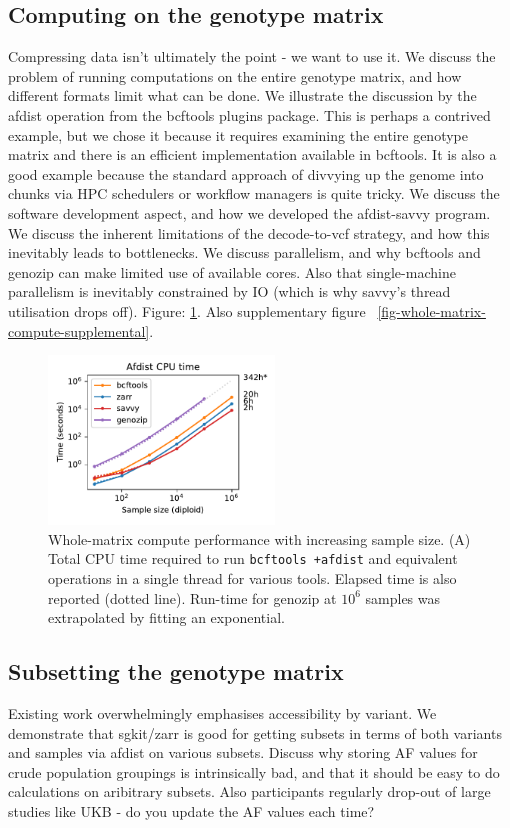 \documentclass[a4paper,num-refs]{oup-contemporary}
\begin{document}
\subsection{Computing on the genotype matrix}
Compressing data isn't ultimately the point - we want to use it.
We discuss the problem of running computations on the entire
genotype matrix, and how different formats limit what can be done.
We illustrate the discussion by the afdist operation from
the bcftools plugins package. This is perhaps a contrived example, but
we chose it because it requires examining the entire genotype matrix
and there is an efficient implementation available in bcftools.
It is also a good example because the standard approach of
divvying up the genome into chunks via HPC schedulers or workflow
managers is quite tricky.
We discuss the software development aspect, and how we developed
the afdist-savvy program. We discuss the inherent limitations
of the decode-to-vcf strategy, and how this inevitably
leads to bottlenecks. We discuss parallelism, and why
bcftools and genozip can make limited use of available cores.
Also that single-machine parallelism is inevitably constrained
by IO (which is why savvy's thread utilisation drops off).
Figure: \ref{fig-whole-matrix-compute}. Also
supplementary figure ~\ref{fig-whole-matrix-compute-supplemental}.


\begin{figure}
\includegraphics[width=6cm]{figures/whole-matrix-compute}
\caption{Whole-matrix compute performance with increasing sample size.
(A) Total CPU time required to run \texttt{bcftools +afdist}
and equivalent operations in a single thread for various tools.
Elapsed time is also reported (dotted line). Run-time for genozip
at $10^6$ samples was extrapolated by fitting an exponential.
\label{fig-whole-matrix-compute}}
\end{figure}

\subsection{Subsetting the genotype matrix}
Existing work overwhelmingly emphasises accessibility by variant.
We demonstrate that sgkit/zarr is good for getting subsets
in terms of both variants and samples via afdist on various subsets.
Discuss why storing AF values for crude population groupings is
intrinsically bad, and that it should be easy to do calculations
on aribitrary subsets. Also participants regularly drop-out of
large studies like UKB - do you update the AF values each time?
\end{document}
